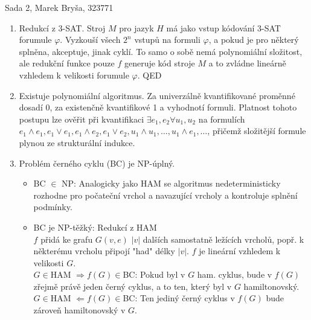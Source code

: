 \documentclass[a4wide,12pt]{extarticle}
\begin{document}
\begin{flushleft}
Sada 2, Marek Bryša, 323771
\end{flushleft}
\begin{enumerate}
  \item
		Redukcí z 3-SAT. Stroj $M$ pro jazyk $H$ má jako vstup kódování 3-SAT forumule $\varphi$. Vyzkouší všech $2^n$ vstupů na formuli $\varphi$, a pokud je pro některý splněna, akceptuje, jinak cyklí. To samo o sobě nemá polynomiální složitost, ale redukční funkce pouze $f$ generuje kód stroje $M$ a to zvládne lineárně vzhledem k velikosti forumule $\varphi$. QED
	\item
		Existuje polynomiální algoritmus. Za univerzálně kvantifikované proměnné dosadí 0, za existenčně kvantifikové 1 a vyhodnotí formuli. Platnost tohoto postupu lze ověřit při kvantifikaci $\exists e_1,e_2 \forall u_1,u_2$ na formulích $e_1 \wedge e_1, e_1 \vee e_1, e_1 \wedge e_2, e_1 \vee e_2, u_1 \wedge u_1, \dots, u_1 \wedge e_1, \dots$, přičemž složitější formule plynou ze strukturální indukce.
	\item
		Problém černého cyklu (BC) je NP-úplný.
		\begin{itemize}
			\item BC $\in$ NP: Analogicky jako HAM se algoritmus nedeterministicky rozhodne pro počateční vrchol a navazující vrcholy a kontroluje splnění podmínky.
			\item
				BC je NP-těžký: Redukcí z HAM\\
				$f$ přidá ke grafu $G(v,e)$ $|v|$ dalších samostatně ležících vrcholů, popř. k některému vrcholu připojí "had" délky $|v|$. $f$ je lineární vzhledem k velikosti $G$.\\
				$G\in$HAM $\Rightarrow f(G)\in$BC: Pokud byl v $G$ ham. cyklus, bude v $f(G)$ zřejmě právě jeden černý cyklus, a to ten, který byl v $G$ hamiltonovský.\\
				$G\in$HAM $\Leftarrow f(G)\in$BC: Ten jediný černý cyklus v $f(G)$ bude zároveň hamiltonovský v $G$.
				

\end{itemize}
\end{enumerate}
\end{document}
